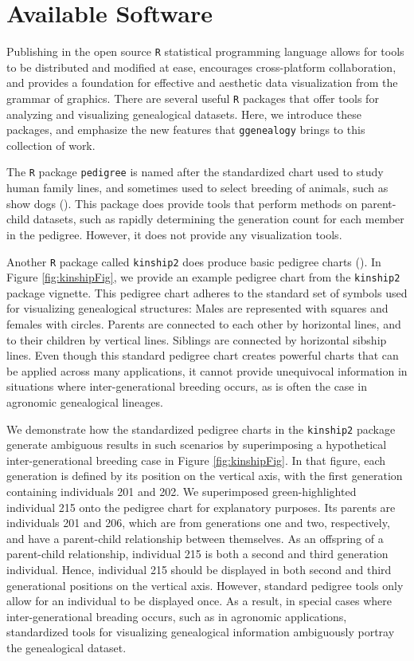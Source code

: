 \documentclass[11pt,a4paper,oldfontcommands,openany]{memoir}
\numberwithin{equation}{section} %
\newcommand{\pkg}[1]{{\texttt{#1}}}
\begin{document}
\section{Available Software}

Publishing in the open source \pkg{R} statistical programming language allows for tools to be distributed and modified at ease, encourages cross-platform collaboration, and provides a foundation for effective and aesthetic data visualization from the grammar of graphics. There are several useful \pkg{R} packages that offer tools for analyzing and visualizing genealogical datasets. Here, we introduce these packages, and emphasize the new features that \pkg{ggenealogy} brings to this collection of work.

The \pkg{R} package \pkg{pedigree} is named after the standardized chart used to study human family lines, and sometimes used to select breeding of animals, such as show dogs (\citealt{ped}). This package does provide tools that perform methods on parent-child datasets, such as rapidly determining the generation count for each member in the pedigree. However, it does not provide any visualization tools.

Another \pkg{R} package called \pkg{kinship2} does produce basic pedigree charts (\citealt{kin}). In Figure \ref{fig:kinshipFig}, we provide an example pedigree chart from the \pkg{kinship2} package vignette. This pedigree chart adheres to the standard set of symbols used for visualizing genealogical structures: Males are represented with squares and females with circles. Parents are connected to each other by horizontal lines, and to their children by vertical lines. Siblings are connected by horizontal sibship lines. Even though this standard pedigree chart creates powerful charts that can be applied across many applications, it cannot provide unequivocal information in situations where inter-generational breeding occurs, as is often the case in agronomic genealogical lineages.

We demonstrate how the standardized pedigree charts in the \pkg{kinship2} package generate ambiguous results in such scenarios by superimposing a hypothetical inter-generational breeding case in Figure \ref{fig:kinshipFig}. In that figure, each generation is defined by its position on the vertical axis, with the first generation containing individuals 201 and 202. We superimposed green-highlighted individual 215 onto the pedigree chart for explanatory purposes. Its parents are individuals 201 and 206, which are from generations one and two, respectively, and have a parent-child relationship between themselves. As an offspring of a parent-child relationship, individual 215 is both a second and third generation individual. Hence, individual 215 should be displayed in both second and third generational positions on the vertical axis. However, standard pedigree tools only allow for an individual to be displayed once. As a result, in special cases where inter-generational breading occurs, such as in agronomic applications, standardized tools for visualizing genealogical information ambiguously portray the genealogical dataset.
\end{document}
